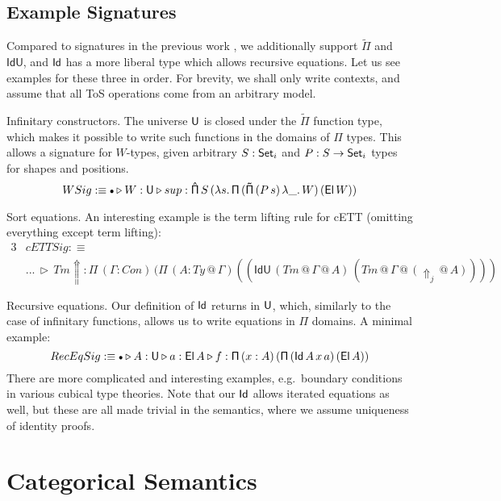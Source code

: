 \documentclass{llncs}
\makeatletter
\newcommand{\Lift}{\Uparrow}
\newcommand{\ext}{\triangleright}
\newcommand{\emptycon}{\scaleobj{.75}\bullet}
\newcommand{\Pii}{\mathsf{\Pi}}
\newcommand{\Pie}{\mathsf{\hat{\Pi}}}
\newcommand{\Piinf}{\mathsf{\tilde{\Pi}}}
\newcommand{\appitt}{\mathop{{\scriptstyle @}}}
\newcommand{\IdU}{\mathsf{IdU}}
\makeatother
\begin{document}
\subsection{Example Signatures}

Compared to signatures in the previous work \cite{TODO}, we additionally support
$\Piinf$ and $\IdU$, and $\mathsf{Id}$ has a more liberal type which allows recursive
equations. Let us see examples for these three in order. For brevity, we shall
only write contexts, and assume that all ToS operations come from an arbitrary
model.

\begin{example}{Infinitary constructors}. The universe $\mathsf{U}$ is closed under
the $\Piinf$ function type, which makes it possible to write such functions
in the domains of $\Pii$ types. This allows a signature for $W$-types, given
arbitrary $S : \mathsf{Set}_i$ and $P : S \rightarrow \mathsf{Set}_i$ types for shapes and positions.
\[
WSig :\equiv
\emptycon \ext W : \U \ext sup : \Pie\,S\,(\lambda s.\,\Pii\,(\Piinf\,(P\,s)\,\lambda \_.\,W) \,(\El\,W))
\]
\end{example}

\begin{example}{Sort equations}. An interesting example is the term lifting
rule for cETT (omitting everything except term lifting):
\begin{alignat*}{3}
  & cETTSig :\equiv \\
  & ...\,\ext\,Tm{\Lift} : \Pii\,(\Gamma : Con)\,(\Pii\,(A : Ty{\appitt}\Gamma)((\IdU\,(Tm{\appitt}\Gamma{\appitt}A)\,(Tm{\appitt}\Gamma{\appitt}(\Lift_j{\appitt}A))))
\end{alignat*}
\end{example}

\begin{example}{Recursive equations}. Our definition of $\mathsf{Id}$ returns in $\mathsf{U}$,
which, similarly to the case of infinitary functions, allows us to write equations
in $\Pii$ domains. A minimal example:
\[
RecEqSig :\equiv \emptycon \ext A : \U \ext a : \El\,A \ext f : \Pii\,(x : A)\,(\Pii\,(\Id\,A\,x\,a)\,(\El\,A))
\]
There are more complicated and interesting examples, e.g.\ boundary conditions in
various cubical type theories\cite{TODO}. Note that our $\mathsf{Id}$ allows iterated
equations as well, but these are all made trivial in the semantics, where we
assume uniqueness of identity proofs.
\end{example}

\section{Categorical Semantics}
\label{sec:categorical_semantics}
\end{document}

